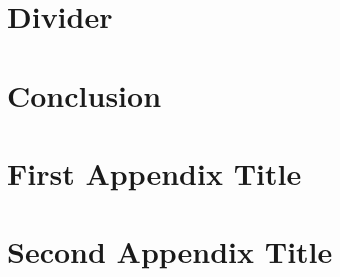 \documentclass[12pt, twoside]{book}
\begin{document}
\chapter{Divider}

\chapter{Conclusion}

\backmatter

\appendix
\chapter{First Appendix Title}

\chapter{Second Appendix Title}

\end{document}
